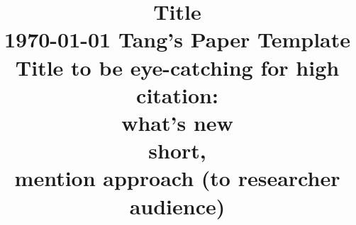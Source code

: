 
\title{
Title
\\ {\large \today}
\ifdefined\TTTOME
Tang's Paper Template \\ Title to be eye-catching for high citation: \\what's new \\short, \\mention approach (to researcher audience)
\fi
}

